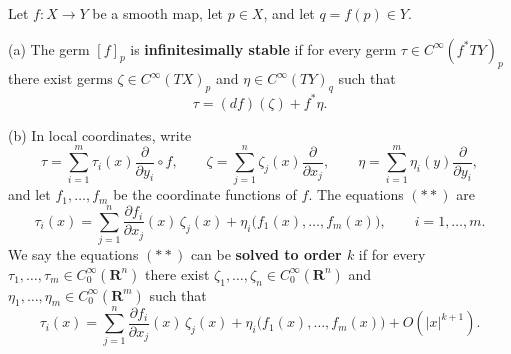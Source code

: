 %

\begin{definition}
Let $f: X \rightarrow Y$ be a smooth map, let $p \in X$, and let $q = f(p) \in Y$.

\textup{(a)} The germ $[f]_p$ is \textbf{infinitesimally stable} if for every germ $\tau \in C^\infty(f^*TY)_p$ there exist germs $\zeta \in C^\infty(TX)_p$ and $\eta \in C^\infty(TY)_q$ such that
\[
\tau = (df)(\zeta) + f^*\eta .
\]

\textup{(b)} In local coordinates, write
\[
\tau = \sum_{i=1}^{m} \tau_i(x) \frac{\partial}{\partial y_i} \circ f,\qquad
\zeta = \sum_{j=1}^{n} \zeta_j(x) \frac{\partial}{\partial x_j},\qquad
\eta = \sum_{i=1}^{m} \eta_i(y) \frac{\partial}{\partial y_i},
\]
and let $f_1,\ldots,f_m$ be the coordinate functions of $f$.
The equations $(**)$ are
\[
\tau_i(x) = \sum_{j=1}^{n} \frac{\partial f_i}{\partial x_j}(x)\, \zeta_j(x)
            + \eta_i\bigl(f_1(x),\ldots,f_m(x)\bigr),\qquad i = 1,\ldots,m .
\]
We say the equations $(**)$ can be \textbf{solved to order $k$} if for every
$\tau_1,\ldots,\tau_m \in C_0^\infty(\mathbf{R}^n)$ there exist
$\zeta_1,\ldots,\zeta_n \in C_0^\infty(\mathbf{R}^n)$ and
$\eta_1,\ldots,\eta_m \in C_0^\infty(\mathbf{R}^m)$ such that
\[
\tau_i(x) = \sum_{j=1}^{n} \frac{\partial f_i}{\partial x_j}(x)\, \zeta_j(x)
            + \eta_i\bigl(f_1(x),\ldots,f_m(x)\bigr) + O(|x|^{k+1}) .
\]
\end{definition}
